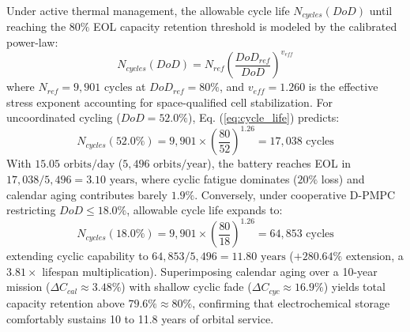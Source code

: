 \documentclass[journal]{IEEEtran}
\begin{document}
Under active thermal management, the allowable cycle life $N_{cycles}(DoD)$ until reaching the $80\%$ EOL capacity retention threshold is modeled by the calibrated power-law:
\begin{equation}
    N_{cycles}(DoD) = N_{ref} \left( \frac{DoD_{ref}}{DoD} \right)^{v_{eff}}
    \label{eq:cycle_life}
\end{equation}
where $N_{ref} = 9,901\text{ cycles}$ at $DoD_{ref} = 80\%$, and $v_{eff} = 1.260$ is the effective stress exponent accounting for space-qualified cell stabilization. For uncoordinated cycling ($DoD = 52.0\%$), Eq. (\ref{eq:cycle_life}) predicts:
\begin{equation}
    N_{cycles}(52.0\%) = 9,901 \times \left(\frac{80}{52}\right)^{1.26} = 17,038\text{ cycles}
\end{equation}
With $15.05\text{ orbits/day}$ ($5,496\text{ orbits/year}$), the battery reaches EOL in $17,038 / 5,496 = 3.10\text{ years}$, where cyclic fatigue dominates ($20\%$ loss) and calendar aging contributes barely $1.9\%$. Conversely, under cooperative D-PMPC restricting $DoD \le 18.0\%$, allowable cycle life expands to:
\begin{equation}
    N_{cycles}(18.0\%) = 9,901 \times \left(\frac{80}{18}\right)^{1.26} = 64,853\text{ cycles}
\end{equation}
extending cyclic capability to $64,853 / 5,496 = 11.80\text{ years}$ ($+280.64\%$ extension, a $3.81\times$ lifespan multiplication). Superimposing calendar aging over a 10-year mission ($\Delta C_{cal} \approx 3.48\%$) with shallow cyclic fade ($\Delta C_{cyc} \approx 16.9\%$) yields total capacity retention above $79.6\% \approx 80\%$, confirming that electrochemical storage comfortably sustains 10 to 11.8 years of orbital service.
\end{document}
